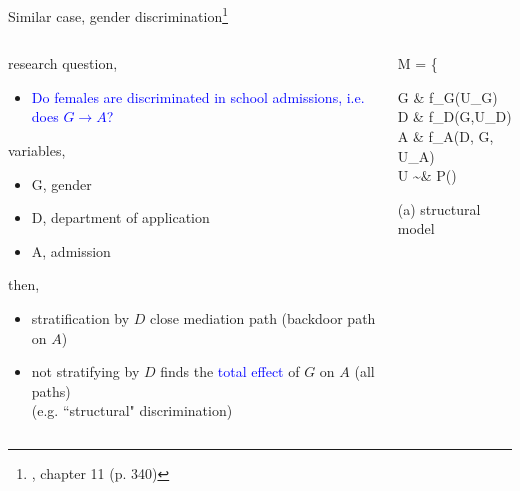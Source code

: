 \begin{frame}
	{Similar case, gender discrimination\footnote{\citet{McElreath_2020}, chapter 11 (p. 340)}}
	\begin{columns}
		\begin{column}{0.5\textwidth}
			research question, 
			\begin{itemize}
				\item \textcolor{blue}{Do females are discriminated in school admissions, i.e. does $G \rightarrow A$?}
			\end{itemize}
			
			variables,
			\begin{itemize}
				\item G, gender
				\item D, department of application
				\item A, admission
			\end{itemize}
			
			then,
			\begin{itemize}
				\item stratification by $D$ close mediation path (backdoor path on $A$)
				\item not stratifying by $D$ finds the \textcolor{blue}{total effect} of $G$ on $A$ (all paths) \\
				{\small (e.g. ``structural" discrimination)}
			\end{itemize}
		\end{column}
		\begin{column}{0.5\textwidth}  
			\begin{equ}
				M = \left\{ \begin{aligned} 
					G \leftarrow & \; f_{G}(U_{G}) \\
					D \leftarrow & \; f_{D}(G,U_{D}) \\
					A \leftarrow & \; f_{A}(D, G, U_{A}) \\
					U \sim & \; P()
				\end{aligned} \right
				\caption*{(a) structural model}
			\end{equ}
			\begin{figure}
\end{figure}
\end{column}
\end{columns}
\end{frame}

